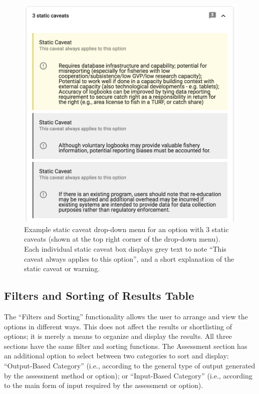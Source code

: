 \documentclass[11pt,]{book}
\begin{document}
\begin{figure}

{\centering \includegraphics[width=0.75\linewidth]{images/static-cav-drop-down} 

}

\caption{Example static caveat drop-down menu for an option with 3 static caveats (shown at the top right corner of the drop-down menu). Each individual static caveat box displays grey text to note “This caveat always applies to this option”, and a short explanation of the static caveat or warning.}\label{fig:static-cav-drop-down}
\end{figure}

\hypertarget{filters-and-sorting-of-results-table}{%
\subsection{Filters and Sorting of Results
Table}\label{filters-and-sorting-of-results-table}}

The ``Filters and Sorting'' functionality allows the user to arrange and
view the options in different ways. This does not affect the results or
shortlisting of options; it is merely a means to organize and display
the results. All three sections have the same filter and sorting
functions. The Assessment section has an additional option to select
between two categories to sort and display: ``Output-Based Category''
(i.e., according to the general type of output generated by the
assessment method or option); or ``Input-Based Category'' (i.e.,
according to the main form of input required by the assessment or
option).
\end{document}
